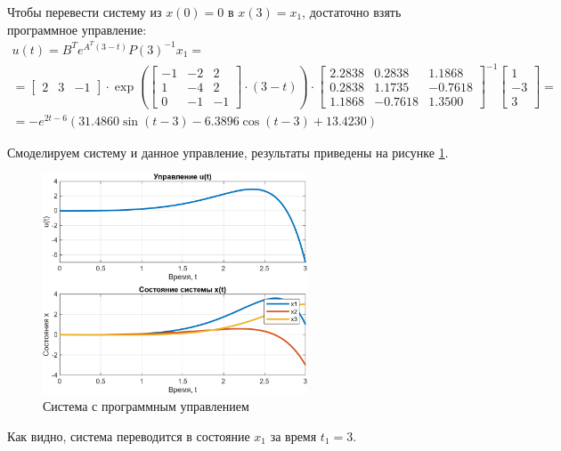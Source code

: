Чтобы перевести систему из $x(0)=0$ в $x(3)=x_1$, достаточно взять программное управление:
\begin{multline*}
    u(t) = B^T e^{A^T(3 - t)} P(3)^{-1} x_1 = \\ =
    \begin{bmatrix}
        2 & 3 & -1
    \end{bmatrix}\cdot
    \exp\left( \begin{bmatrix}
        -1 & -2 & 2 \\ 
         1 & -4 & 2 \\ 
         0 & -1 & -1
    \end{bmatrix}\cdot(3 - t) \right)\cdot
    \begin{bmatrix}
        2.2838  &  0.2838  &  1.1868 \\
        0.2838   & 1.1735  & -0.7618 \\
        1.1868  & -0.7618  &  1.3500
    \end{bmatrix}^{-1}
    \begin{bmatrix}
        1 \\ -3 \\ 3
    \end{bmatrix}=\\
    =-e^{2t-6}\left(31.4860\sin\left(t-3\right)-6.3896\cos\left(t-3\right)+13.4230\right)
\end{multline*}

Смоделируем систему и данное управление, результаты приведены на рисунке \ref{fig:task1}.
\begin{figure}[H]
    \centering
    \includegraphics[width=0.7\textwidth]{figs/task_1.png}
    \caption{Система с программным управлением}
    \label{fig:task1}
\end{figure}
Как видно, система переводится в состояние $x_1$ за время $t_1=3$.

